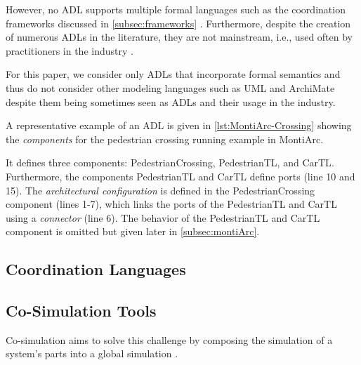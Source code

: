\documentclass[runningheads]{llncs}
\begin{document}
However, no ADL supports multiple formal languages such as the coordination frameworks discussed in \autoref{subsec:frameworks} \cite{medvidovicClassificationComparisonFramework2000}.
Furthermore, despite the creation of numerous ADLs in the literature, they are not mainstream, i.e., used often by practitioners in the industry \cite{clementsSurveyArchitectureDescription1996,woodsArchitectureDescriptionLanguages2005,pandeyArchitecturalDescriptionLanguages2010,ozkayaAreWeThere2013}.

For this paper, we consider only ADLs that incorporate formal semantics and thus do not consider other modeling languages such as UML \cite{objectmanagementgroupUnifiedModelingLanguage2017} and ArchiMate \cite{theopengroupArchiMateSpecification2023} despite them being sometimes seen as ADLs and their usage in the industry.

A representative example of an ADL is given in  \autoref{lst:MontiArc-Crossing} showing the \textit{components} for the pedestrian crossing running example in MontiArc.



It defines three components: \textsf{PedestrianCrossing}, \textsf{PedestrianTL}, and \textsf{CarTL}.
Furthermore, the components \textsf{PedestrianTL} and \textsf{CarTL} define ports (line 10 and 15).
The \textit{architectural configuration} is defined in the \textsf{PedestrianCrossing} component (lines 1-7), which links the ports of the \textsf{PedestrianTL} and \textsf{CarTL} using a \textit{connector} (line 6).
The behavior of the \textsf{PedestrianTL} and \textsf{CarTL} component is omitted but given later in \autoref{subsec:montiArc}.

\subsection{Coordination Languages}

\subsection{Co-Simulation Tools}
\cite{gomesCoSimulationSurvey2019} %

Co-simulation aims to solve this challenge by composing the simulation of a system's parts into a global simulation \cite{gomesCoSimulationSurvey2019}.
\end{document}
